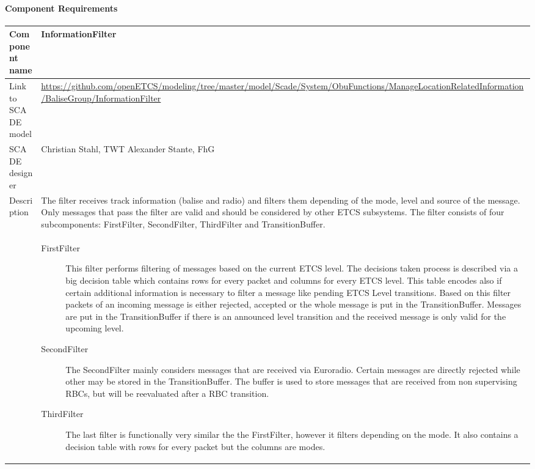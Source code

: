 
\paragraph{Component Requirements}


\begin{longtable}{p{}p{}}
\toprule
Component name			& InformationFilter \\
\midrule
Link to SCADE model		& {\footnotesize \url{https://github.com/openETCS/modeling/tree/master/model/Scade/System/ObuFunctions/ManageLocationRelatedInformation/BaliseGroup/InformationFilter}} \\
\midrule
SCADE designer			& Christian Stahl, TWT\newline
Alexander Stante, FhG \\
\midrule
Description				& The filter receives track information (balise and radio) and filters them depending of the mode, level and source of the message. Only messages that pass the filter are valid and should be considered by other ETCS subsystems. The filter  consists of four subcomponents: FirstFilter, SecondFilter, ThirdFilter and TransitionBuffer.\\
&
\begin{description}
\item[FirstFilter] This filter performs filtering of messages
based on the current ETCS level. The decisions taken process is
described via a big decision table which contains rows for every
packet and columns for every ETCS level. This table encodes also if
certain additional information is necessary to filter a message like
pending ETCS Level transitions. Based on this filter packets of an
incoming message is either rejected, accepted or the whole message is
put in the TransitionBuffer. Messages are put in the TransitionBuffer
if there is an announced level transition and the received message is
only valid for the upcoming level.

\item[SecondFilter] The SecondFilter mainly considers messages
that are received via Euroradio. Certain messages are directly
rejected while other may be stored in the TransitionBuffer. The buffer
is used to store messages that are received from non supervising RBCs,
but will be reevaluated after a RBC transition.

\item[ThirdFilter] The last filter is functionally very similar
the the FirstFilter, however it filters depending on the mode. It also
contains a decision table with rows for every packet but the columns
are modes.


\end{description}
\end{longtable}
